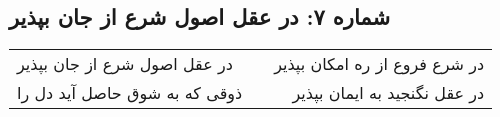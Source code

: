 \begin{center}
\section*{شماره ۷: در عقل اصول شرع از جان بپذیر}
\label{sec:007}
\begin{longtable}{l p{0.5cm} r}
در عقل اصول شرع از جان بپذیر
&&
در شرع فروع از ره امکان بپذیر
\\
ذوقی که به شوق حاصل آید دل را
&&
در عقل نگنجید به ایمان بپذیر
\\
\end{longtable}
\end{center}
